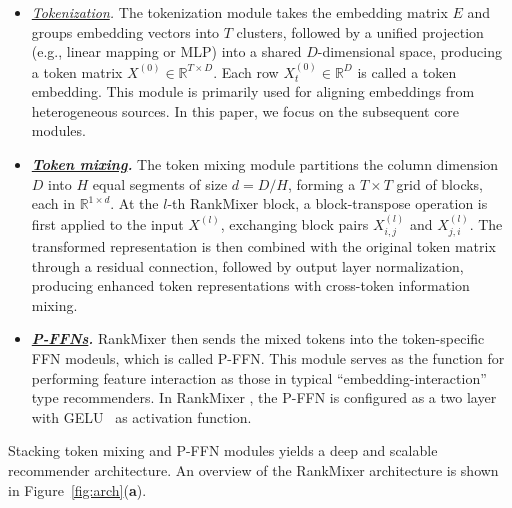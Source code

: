 \documentclass[sigconf,screen]{acmart}
\newcommand{\rankmixer}{RankMixer }
\begin{document}
\begin{itemize}[leftmargin=15pt,parsep=2pt,itemsep=2pt,topsep=2pt]
    \item {\it \underline{Tokenization}.} The tokenization module takes the embedding matrix \(E\) and groups embedding vectors into \(T\) clusters, followed by a unified projection (e.g., linear mapping or MLP) into a shared \(D\)-dimensional space, producing a token matrix \(X^{(0)}\in\mathbb{R}^{T\times D}\). 
    Each row \(X^{(0)}_t\in\mathbb{R}^D\) is called a token embedding. 
    This module is primarily used for aligning embeddings from heterogeneous sources. 
    In this paper, we focus on the subsequent core modules.
    
    \item \textbf{\textit{\underline{Token mixing}.}} The token mixing module partitions the column dimension \(D\) into \(H\) equal segments of size \(d = D/H\), forming a \(T \times T\) grid of blocks, each in \(\mathbb{R}^{1 \times d}\). 
    At the \(l\)-th \rankmixer block, a block-transpose operation is first applied to the input \(X^{(l)}\), exchanging block pairs \(X^{(l)}_{i,j}\) and \(X^{(l)}_{j,i}\). 
    The transformed representation is then combined with the original token matrix through a residual connection, followed by output layer normalization, producing enhanced token representations with cross-token information mixing.
    
    \item \textbf{\textit{\underline{P-FFNs}.}} \rankmixer then sends the mixed tokens into the token-specific FFN modeuls, which is called P-FFN. 
    This module serves as the function for performing feature interaction as those in typical ``embedding-interaction'' type recommenders. 
    In \rankmixer, the P-FFN is configured as a two layer with GELU~\cite{GELU-activation} as activation function.
\end{itemize}

Stacking token mixing and P-FFN modules yields a deep and scalable recommender architecture. 
An overview of the \rankmixer architecture is shown in Figure~\ref{fig:arch}(\textbf{a}).
\end{document}
